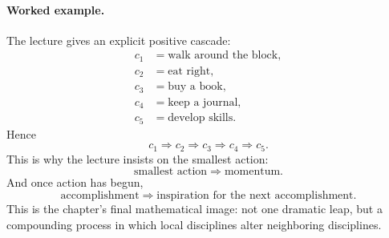 \begin{figure}
\centering
{}
\end{figure}

\paragraph{Worked example.} The lecture gives an explicit positive cascade:
\begin{align}
c_1 &= \text{walk around the block},\\
c_2 &= \text{eat right},\\
c_3 &= \text{buy a book},\\
c_4 &= \text{keep a journal},\\
c_5 &= \text{develop skills}.
\end{align}
Hence
\begin{equation}
c_1 \Rightarrow c_2 \Rightarrow c_3 \Rightarrow c_4 \Rightarrow c_5.
\end{equation}
This is why the lecture insists on the smallest action:
\begin{equation}
\text{smallest action} \Rightarrow \text{momentum}.
\end{equation}
And once action has begun,
\begin{equation}
\text{accomplishment} \Rightarrow \text{inspiration for the next accomplishment}.
\end{equation}
This is the chapter's final mathematical image: not one dramatic leap, but a compounding process in which local disciplines alter neighboring disciplines.

